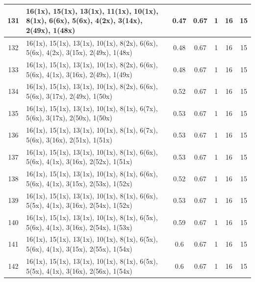 \begin{small}
\begin{longtable}{|c|p{4cm}|c|c|c|c|c|}
  131 & 16(1x), 15(1x), 13(1x), 11(1x), 10(1x), 8(1x), 6(6x), 5(6x), 4(2x), 3(14x), 2(49x), 1(48x) & \cellcolor{colorGood}  0.47 & \cellcolor{colorGood} 0.67 & 1 & 16 & \cellcolor{colorBad} 15 \\   \hline
  132 & 16(1x), 15(1x), 13(1x), 10(1x), 8(2x), 6(6x), 5(6x), 4(2x), 3(15x), 2(49x), 1(48x) & \cellcolor{colorGood}  0.48 & \cellcolor{colorGood} 0.67 & 1 & 16 & \cellcolor{colorBad} 15 \\   \hline
  133 & 16(1x), 15(1x), 13(1x), 10(1x), 8(2x), 6(6x), 5(6x), 4(1x), 3(16x), 2(49x), 1(49x) & \cellcolor{colorGood}  0.48 & \cellcolor{colorGood} 0.67 & 1 & 16 & \cellcolor{colorBad} 15 \\   \hline
  134 & 16(1x), 15(1x), 13(1x), 10(1x), 8(2x), 6(6x), 5(6x), 3(17x), 2(49x), 1(50x) & \cellcolor{colorGood}  0.52 & \cellcolor{colorGood} 0.67 & 1 & 16 & \cellcolor{colorBad} 15 \\   \hline
  135 & 16(1x), 15(1x), 13(1x), 10(1x), 8(1x), 6(7x), 5(6x), 3(17x), 2(50x), 1(50x) & \cellcolor{colorGood}  0.53 & \cellcolor{colorGood} 0.67 & 1 & 16 & \cellcolor{colorBad} 15 \\   \hline
  136 & 16(1x), 15(1x), 13(1x), 10(1x), 8(1x), 6(7x), 5(6x), 3(16x), 2(51x), 1(51x) & \cellcolor{colorGood}  0.53 & \cellcolor{colorGood} 0.67 & 1 & 16 & \cellcolor{colorBad} 15 \\   \hline
  137 & 16(1x), 15(1x), 13(1x), 10(1x), 8(1x), 6(6x), 5(6x), 4(1x), 3(16x), 2(52x), 1(51x) & \cellcolor{colorGood}  0.53 & \cellcolor{colorGood} 0.67 & 1 & 16 & \cellcolor{colorBad} 15 \\   \hline
  138 & 16(1x), 15(1x), 13(1x), 10(1x), 8(1x), 6(6x), 5(6x), 4(1x), 3(15x), 2(53x), 1(52x) & \cellcolor{colorGood}  0.52 & \cellcolor{colorGood} 0.67 & 1 & 16 & \cellcolor{colorBad} 15 \\   \hline
  139 & 16(1x), 15(1x), 13(1x), 10(1x), 8(1x), 6(6x), 5(5x), 4(1x), 3(16x), 2(54x), 1(52x) & \cellcolor{colorGood}  0.53 & \cellcolor{colorGood} 0.67 & 1 & 16 & \cellcolor{colorBad} 15 \\   \hline
  140 & 16(1x), 15(1x), 13(1x), 10(1x), 8(1x), 6(5x), 5(6x), 4(1x), 3(16x), 2(54x), 1(53x) & \cellcolor{colorOK}  0.59 & \cellcolor{colorOK} 0.67 & 1 & 16 & \cellcolor{colorBad} 15 \\   \hline
  141 & 16(1x), 15(1x), 13(1x), 10(1x), 8(1x), 6(5x), 5(6x), 4(1x), 3(15x), 2(55x), 1(54x) & \cellcolor{colorOK}  0.6 & \cellcolor{colorOK} 0.67 & 1 & 16 & \cellcolor{colorBad} 15 \\   \hline
  142 & 16(1x), 15(1x), 13(1x), 10(1x), 8(1x), 6(5x), 5(5x), 4(1x), 3(16x), 2(56x), 1(54x) & \cellcolor{colorOK}  0.6 & \cellcolor{colorOK} 0.67 & 1 & 16 & \cellcolor{colorBad} 15 \\   \hline

\end{longtable}
\end{small}
